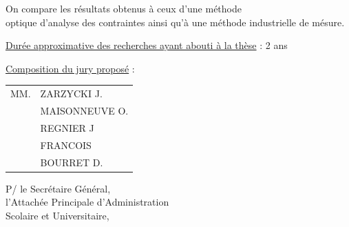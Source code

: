 On compare les résultats obtenus à ceux d'une méthode\\
optique d'analyse des contraintes ainsi qu'à une méthode industrielle de mésure.

\uline{Durée approximative des recherches ayant abouti à la thèse} : 2 ans

\uline{Composition du jury proposé} : \begin{tabular}[t]{ll}
MM. & ZARZYCKI J.\\
& MAISONNEUVE O.\\
& REGNIER J\\
& FRANCOIS\\
& BOURRET D.
\end{tabular}

\begin{flushright}
\begin{minipage}{0.55\textwidth}
\raggedright
P/ le Secrétaire Général,\\
\hspace*{1em}l'Attachée Principale d'Administration\\
\hspace*{1em}Scolaire et Universitaire,


\end{minipage}
\end{flushright}
